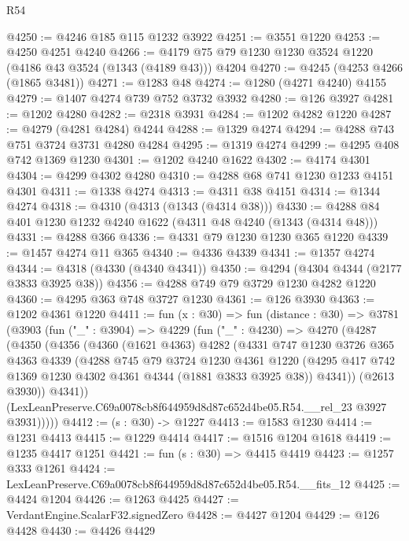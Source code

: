 \begin{lexlean}{R54}
\begin{coremodule}
@4250 := @4246 @185 @115 @1232 @3922
@4251 := @3551 @1220
@4253 := @4250 @4251 @4240
@4266 := @4179 @75 @79 @1230 @1230 @3524 @1220 (@4186 @43 @3524 (@1343 (@4189 @43))) @4204
@4270 := @4245 (@4253 @4266 (@1865 @3481))
@4271 := @1283 @48
@4274 := @1280 (@4271 @4240) @4155
@4279 := @1407 @4274 @739 @752 @3732 @3932
@4280 := @126 @3927
@4281 := @1202 @4280
@4282 := @2318 @3931
@4284 := @1202 @4282 @1220
@4287 := @4279 (@4281 @4284) @4244
@4288 := @1329 @4274
@4294 := @4288 @743 @751 @3724 @3731 @4280 @4284
@4295 := @1319 @4274
@4299 := @4295 @408 @742 @1369 @1230
@4301 := @1202 @4240 @1622
@4302 := @4174 @4301
@4304 := @4299 @4302 @4280
@4310 := @4288 @68 @741 @1230 @1233 @4151 @4301
@4311 := @1338 @4274
@4313 := @4311 @38 @4151
@4314 := @1344 @4274
@4318 := @4310 (@4313 (@1343 (@4314 @38)))
@4330 := @4288 @84 @401 @1230 @1232 @4240 @1622 (@4311 @48 @4240 (@1343 (@4314 @48)))
@4331 := @4288 @366
@4336 := @4331 @79 @1230 @1230 @365 @1220
@4339 := @1457 @4274 @11 @365
@4340 := @4336 @4339
@4341 := @1357 @4274
@4344 := @4318 (@4330 (@4340 @4341))
@4350 := @4294 (@4304 @4344 (@2177 @3833 @3925 @38))
@4356 := @4288 @749 @79 @3729 @1230 @4282 @1220
@4360 := @4295 @363 @748 @3727 @1230
@4361 := @126 @3930
@4363 := @1202 @4361 @1220
@4411 := fun (x : @30) =>
  fun (distance : @30) =>
  @3781
    (@3903
      (fun ("_" : @3904) =>
      @4229
        (fun ("_" : @4230) =>
        @4270
          (@4287
            (@4350
              (@4356
                (@4360
                  (@1621 @4363)
                  @4282
                  (@4331
                    @747
                    @1230
                    @3726
                    @365
                    @4363
                    @4339
                    (@4288
                      @745
                      @79
                      @3724
                      @1230
                      @4361
                      @1220
                      (@4295 @417 @742 @1369 @1230 @4302 @4361 @4344 (@1881 @3833 @3925 @38))
                      @4341))
                  (@2613 @3930))
                @4341))
            (LexLeanPreserve.C69a0078cb8f644959d8d87c652d4be05.R54.__rel_23 @3927 @3931)))))
@4412 := (s : @30) -> @1227
@4413 := @1583 @1230
@4414 := @1231 @4413
@4415 := @1229 @4414
@4417 := @1516 @1204 @1618
@4419 := @1235 @4417 @1251
@4421 := fun (s : @30) => @4415 @4419
@4423 := @1257 @333 @1261
@4424 := LexLeanPreserve.C69a0078cb8f644959d8d87c652d4be05.R54.__fits_12
@4425 := @4424 @1204
@4426 := @1263 @4425
@4427 := VerdantEngine.ScalarF32.signedZero
@4428 := @4427 @1204
@4429 := @126 @4428
@4430 := @4426 @4429

\end{coremodule}
\end{lexlean}
